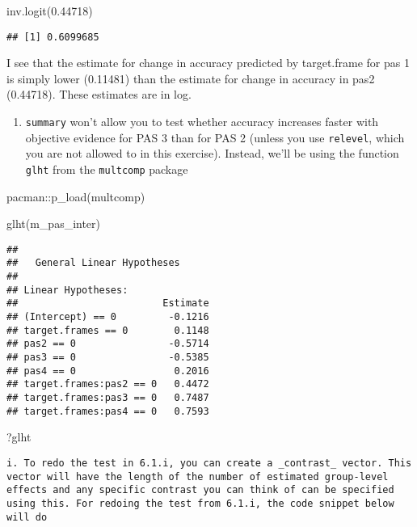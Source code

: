 \documentclass[
]{article}
\newenvironment{Shaded}{\begin{snugshade}}{\end{snugshade}}
\newcommand{\FloatTok}[1]{\textcolor[rgb]{0.00,0.00,0.81}{#1}}
\newcommand{\FunctionTok}[1]{\textcolor[rgb]{0.00,0.00,0.00}{#1}}
\newcommand{\NormalTok}[1]{#1}
\newcommand{\SpecialCharTok}[1]{\textcolor[rgb]{0.00,0.00,0.00}{#1}}
\providecommand{\tightlist}{%
  \setlength{\itemsep}{0pt}\setlength{\parskip}{0pt}}
\begin{document}
\begin{Shaded}
\begin{Highlighting}[]
\FunctionTok{inv.logit}\NormalTok{(}\FloatTok{0.44718}\NormalTok{)}
\end{Highlighting}
\end{Shaded}

\begin{verbatim}
## [1] 0.6099685
\end{verbatim}

I see that the estimate for change in accuracy predicted by target.frame
for pas 1 is simply lower (0.11481) than the estimate for change in
accuracy in pas2 (0.44718). These estimates are in log.

\begin{enumerate}
\def\labelenumi{\arabic{enumi})}
\setcounter{enumi}{1}
\tightlist
\item
  \texttt{summary} won't allow you to test whether accuracy increases
  faster with objective evidence for PAS 3 than for PAS 2 (unless you
  use \texttt{relevel}, which you are not allowed to in this exercise).
  Instead, we'll be using the function \texttt{glht} from the
  \texttt{multcomp} package
\end{enumerate}

\begin{Shaded}
\begin{Highlighting}[]
\NormalTok{pacman}\SpecialCharTok{::}\FunctionTok{p\_load}\NormalTok{(multcomp)}

\FunctionTok{glht}\NormalTok{(m\_pas\_inter)}
\end{Highlighting}
\end{Shaded}

\begin{verbatim}
## 
##   General Linear Hypotheses
## 
## Linear Hypotheses:
##                         Estimate
## (Intercept) == 0         -0.1216
## target.frames == 0        0.1148
## pas2 == 0                -0.5714
## pas3 == 0                -0.5385
## pas4 == 0                 0.2016
## target.frames:pas2 == 0   0.4472
## target.frames:pas3 == 0   0.7487
## target.frames:pas4 == 0   0.7593
\end{verbatim}

\begin{Shaded}
\begin{Highlighting}[]
\NormalTok{?glht}
\end{Highlighting}
\end{Shaded}

\begin{verbatim}
i. To redo the test in 6.1.i, you can create a _contrast_ vector. This vector will have the length of the number of estimated group-level effects and any specific contrast you can think of can be specified using this. For redoing the test from 6.1.i, the code snippet below will do
\end{verbatim}
\end{document}
